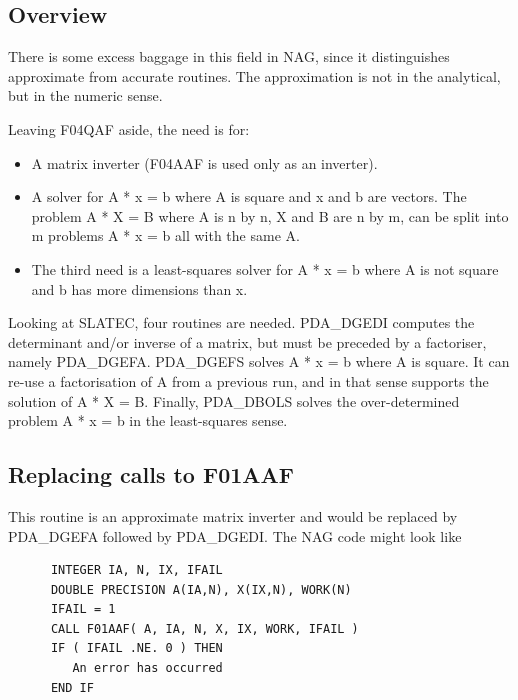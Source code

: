 \documentclass[11pt,twoside]{article}
\newcommand{\htmlref}[2]{#1}
\newcommand{\xlabel}[1]{}
\begin{document}

\subsection{\xlabel{overview}Overview}

   There is some excess baggage in this field in NAG, since it
   distinguishes approximate from accurate routines. The approximation
   is not in the analytical, but in the numeric sense.

   Leaving F04QAF aside, the need is for:

\begin{itemize}
\item A matrix inverter (F04AAF is used only as an inverter).
\item A solver for A * x = b where A is square and x and b are vectors.
   The problem A * X = B where A is n by n, X and B are n by m, can be
   split into m problems A * x = b all with the same A.
\item The third need is a least-squares solver for A * x = b where A is
   not square and b has more dimensions than x.
\end{itemize}

   Looking at SLATEC, four routines are needed. PDA\_DGEDI computes the
   determinant and/or inverse of a matrix, but must be preceded by a
   factoriser, namely PDA\_DGEFA. PDA\_DGEFS solves A * x = b where A is square.
   It can re-use a factorisation of A from a previous run, and in that
   sense supports the solution of A * X = B. Finally, PDA\_DBOLS solves the
   over-determined problem A * x = b in the least-squares sense.


\subsection{\xlabel{replacing_calls_to_f01aaf}Replacing calls to F01AAF}

   This routine is an approximate matrix inverter and would be replaced
   by
\htmlref{PDA\_DGEFA}{PDA\_DGEFA}
   followed by
\htmlref{PDA\_DGEDI.}{PDA\_DGEDI}
   The NAG code might look like

\begin{verbatim}
      INTEGER IA, N, IX, IFAIL
      DOUBLE PRECISION A(IA,N), X(IX,N), WORK(N)
      IFAIL = 1
      CALL F01AAF( A, IA, N, X, IX, WORK, IFAIL )
      IF ( IFAIL .NE. 0 ) THEN
         An error has occurred
      END IF
\end{verbatim}
\end{document}
